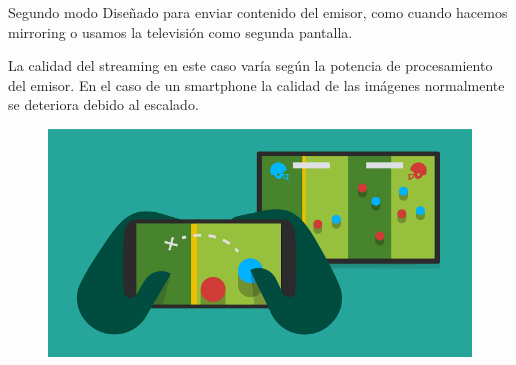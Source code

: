 \begin{frame}
	\begin{block}{Segundo modo}
		Diseñado para enviar contenido del emisor, como cuando hacemos mirroring o usamos la televisión como segunda pantalla.

		La calidad del streaming en este caso varía según la potencia de procesamiento del emisor. En el caso de un smartphone la calidad
		de las imágenes normalmente se deteriora debido al escalado.
	\end{block}

	\begin{figure}[h]
		\includegraphics[scale=0.3]{./Imagenes/seconddisplay.png}
	\end{figure}
\end{frame}


